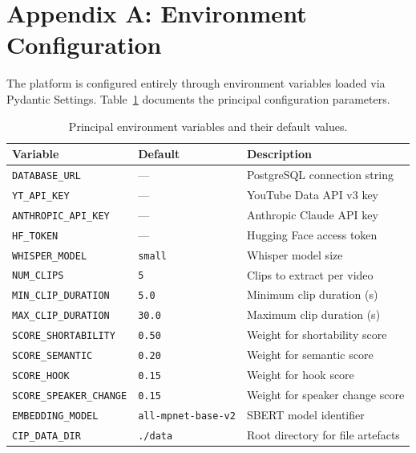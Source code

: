 \documentclass[ENG]{TFUOC}
\begin{document}
\section*{Appendix A: Environment Configuration}

The platform is configured entirely through environment variables loaded via Pydantic Settings. Table~\ref{tab:env_vars} documents the principal configuration parameters.

\begin{table}[H]
\centering
\caption{Principal environment variables and their default values.}
\label{tab:env_vars}
\begin{tabular}{@{}llp{5cm}@{}}
\toprule
\textbf{Variable} & \textbf{Default} & \textbf{Description} \\
\midrule
\texttt{DATABASE\_URL}       & —                   & PostgreSQL connection string \\
\texttt{YT\_API\_KEY}        & —                   & YouTube Data API v3 key \\
\texttt{ANTHROPIC\_API\_KEY} & —                   & Anthropic Claude API key \\
\texttt{HF\_TOKEN}           & —                   & Hugging Face access token \\
\texttt{WHISPER\_MODEL}      & \texttt{small}      & Whisper model size \\
\texttt{NUM\_CLIPS}          & \texttt{5}          & Clips to extract per video \\
\texttt{MIN\_CLIP\_DURATION} & \texttt{5.0}        & Minimum clip duration (s) \\
\texttt{MAX\_CLIP\_DURATION} & \texttt{30.0}       & Maximum clip duration (s) \\
\texttt{SCORE\_SHORTABILITY} & \texttt{0.50}       & Weight for shortability score \\
\texttt{SCORE\_SEMANTIC}     & \texttt{0.20}       & Weight for semantic score \\
\texttt{SCORE\_HOOK}         & \texttt{0.15}       & Weight for hook score \\
\texttt{SCORE\_SPEAKER\_CHANGE} & \texttt{0.15}    & Weight for speaker change score \\
\texttt{EMBEDDING\_MODEL}    & \texttt{all-mpnet-base-v2} & SBERT model identifier \\
\texttt{CIP\_DATA\_DIR}      & \texttt{./data}     & Root directory for file artefacts \\
\bottomrule
\end{tabular}
\end{table}
\end{document}
